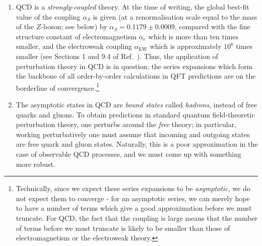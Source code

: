 \documentclass[withindex,glossary]{cam-thesis}
\begin{document}
\begin{enumerate}[label = (\arabic*)]
\item QCD is a \textit{strongly-coupled} theory. At the time of writing, the global best-fit value of the coupling $\alpha_S$ is given (at a renormalisation scale equal to the mass of the $Z$-boson; see below) by $\alpha_S = 0.1179 \pm 0.0009$, compared with the fine structure constant of electromagnetism $\alpha_e$ which is more than ten times smaller, and the electroweak coupling $\alpha_{\text{EW}}$ which is approximately $10^6$ times smaller (see Sections 1 and 9.4 of Ref.~\cite{ParticleDataGroup:2022pth}). Thus, the application of perturbation theory in QCD is in question; the series expansions which form the backbone of all order-by-order calculations in QFT predictions are on the borderline of convergence.\footnote{Technically, since we expect these series expansions to be \textit{asymptotic}, we do not expect them to converge - for an asymptotic series, we can merely hope to have a number of terms which give a good approximation before we must truncate. For QCD, the fact that the coupling is large means that the number of terms before we must truncate is likely to be smaller than those of electromagnetism or the electroweak theory.} 
  
\item The asymptotic states in QCD are \textit{bound states} called \textit{hadrons}, instead of free quarks and gluons.  To obtain predictions in standard quantum field-theoretic perturbation theory, one perturbs around the \textit{free} theory; in particular, working perturbatively one must assume that incoming and outgoing states are free quark and gluon states. Naturally, this is a poor approximation in the case of observable QCD processes, and we must come up with something more robust.
\end{enumerate}
\end{document}
